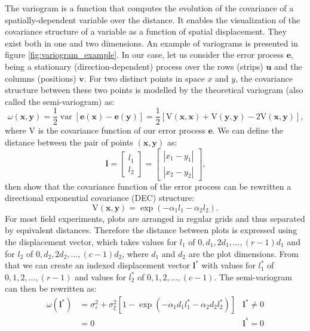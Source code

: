 The variogram is a function that computes the evolution of the covariance of a spatially-dependent variable over the distance.
It enables the visualization of the covariance structure of a variable as a function of spatial displacement. They exist both in one and two dimensions. An example of variograms is presented in figure \ref{fig:variogram_example}. In our case, let us consider the error process $\mathbf{e}$, being a stationary (direction-dependent) process over the rows (strips) $\mathbf{u}$ and the columns (positions) $\mathbf{v}$. For two distinct points in space $x$ and $y$, the covariance structure between these two points is modelled by the theoretical variogram (also called the semi-variogram) as:
\begin{equation}
    \omega(\mathbf{x}, \mathbf{y})=\frac{1}{2} \operatorname{var}[\mathbf{e}(\mathbf{x})-\mathbf{e}(\mathbf{y})]=\frac{1}{2}
    [\mathrm{V}(\mathbf{x}, \mathbf{x})+\mathrm{V}(\mathbf{y}, \mathbf{y})-2 \mathrm{V}(\mathbf{x}, \mathbf{y})]
    \text{,}
\end{equation}
where $\mathrm{V}$ is the covariance function of our error process $\mathbf{e}$. We can define the distance between the pair of points $(\mathbf{x},\mathbf{y})$ as:
\begin{equation*}
    \mathbf{l}=\left[ \begin{array}{l}{l_{1}} \\ {l_{2}}\end{array}\right]=\left[ \begin{array}{l}{\left|x_{1}-y_{1}\right|} \\ 
    {\left|x_{2}-y_{2}\right|}\end{array}\right]
    \text{,}
\end{equation*}
then \textcite{zimmerman_random_1991} show that the covariance function of the error process can be rewritten a directional exponential covariance (DEC) structure:
\begin{equation}
	\mathrm{V}(\mathbf{x},\mathbf{y}) = \operatorname{exp}(-\alpha_{1}l_{1} - \alpha_{2}l_{2})
	\text{.}
\end{equation}
For most field experiments, plots are arranged in regular grids and thus separated by equivalent distances. Therefore the distance between plots is expressed using the displacement vector, which takes values for $l_1$ of $0,d_1,2d_1,\ldots,(r-1)d_1$ and for $l_2$ of $0,d_2,2d_2,\ldots,(c-1)d_2$, where $d_1$ and $d_2$ are the plot dimensions. 
From that we can create an indexed displacement vector $\mathbf{l}^{*}$ with values for $l_1^*$ of $0,1,2,\ldots,(r-1)$ and values for $l_2^*$ of $0,1,2,\ldots,(c-1)$.
The semi-variogram can then be rewritten as:
\begin{equation}
    \begin{aligned}
        \omega\left(\mathbf{l}^{*}\right) & = \sigma_{\varepsilon}^{2}+\sigma_{\xi}^{2}\left[1-\exp \left(-\alpha_{1} d_{1} 
        l_{1}^{*} - \alpha_{2} d_{2} l_{2}^{*} \right) \right] 
        &  \mathbf{l}^* \neq 0 \\
        & = 0
        & \mathbf{l}^* = 0 
    \end{aligned}
    \label{eq:variogram_DEC}
\end{equation}

